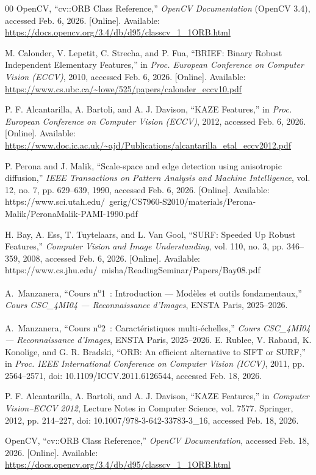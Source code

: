 \documentclass[conference]{IEEEtran}
\begin{document}
\begin{thebibliography}{00}
OpenCV, ``cv::ORB Class Reference,'' \emph{OpenCV Documentation} (OpenCV 3.4), accessed Feb. 6, 2026. [Online]. Available: \url{https://docs.opencv.org/3.4/db/d95/classcv_1_1ORB.html}

M. Calonder, V. Lepetit, C. Strecha, and P. Fua, ``BRIEF: Binary Robust Independent Elementary Features,'' in \emph{Proc. European Conference on Computer Vision (ECCV)}, 2010, accessed Feb. 6, 2026. [Online]. Available: \url{https://www.cs.ubc.ca/~lowe/525/papers/calonder_eccv10.pdf}

P. F. Alcantarilla, A. Bartoli, and A. J. Davison, ``KAZE Features,'' in \emph{Proc. European Conference on Computer Vision (ECCV)}, 2012, accessed Feb. 6, 2026. [Online]. Available: \url{https://www.doc.ic.ac.uk/~ajd/Publications/alcantarilla_etal_eccv2012.pdf}

P. Perona and J. Malik, ``Scale-space and edge detection using anisotropic diffusion,'' \emph{IEEE Transactions on Pattern Analysis and Machine Intelligence}, vol. 12, no. 7, pp. 629--639, 1990, accessed Feb. 6, 2026. [Online]. Available: https://www.sci.utah.edu/~gerig/CS7960-S2010/materials/Perona-Malik/PeronaMalik-PAMI-1990.pdf

H. Bay, A. Ess, T. Tuytelaars, and L. Van Gool, ``SURF: Speeded Up Robust Features,'' \emph{Computer Vision and Image Understanding}, vol. 110, no. 3, pp. 346--359, 2008, accessed Feb. 6, 2026. [Online]. Available: https://www.cs.jhu.edu/~misha/ReadingSeminar/Papers/Bay08.pdf

A.~Manzanera, ``Cours n\textsuperscript{o}1~: Introduction --- Mod\`eles et outils fondamentaux,'' \emph{Cours CSC\_4MI04 --- Reconnaissance d'Images}, ENSTA Paris, 2025--2026.

A.~Manzanera, ``Cours n\textsuperscript{o}2~: Caract\'eristiques multi-\'echelles,'' \emph{Cours CSC\_4MI04 --- Reconnaissance d'Images}, ENSTA Paris, 2025--2026.
E. Rublee, V. Rabaud, K. Konolige, and G. R. Bradski, ``ORB: An efficient alternative to SIFT or SURF,'' in \emph{Proc. IEEE International Conference on Computer Vision (ICCV)}, 2011, pp. 2564--2571, doi: 10.1109/ICCV.2011.6126544, accessed Feb. 18, 2026.

P. F. Alcantarilla, A. Bartoli, and A. J. Davison, ``KAZE Features,'' in \emph{Computer Vision--ECCV 2012}, Lecture Notes in Computer Science, vol. 7577. Springer, 2012, pp. 214--227, doi: 10.1007/978-3-642-33783-3\_16, accessed Feb. 18, 2026.

OpenCV, ``cv::ORB Class Reference,'' \emph{OpenCV Documentation}, accessed Feb. 18, 2026. [Online]. Available: \url{https://docs.opencv.org/3.4/db/d95/classcv_1_1ORB.html}

\end{thebibliography}
\end{document}
